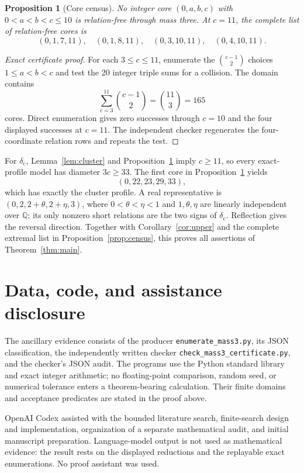 \documentclass[11pt]{article}
\newtheorem{proposition}[theorem]{Proposition}
\theoremstyle{definition}
\newcommand{\Q}{\mathbb Q}
\begin{document}
\begin{proposition}[Core census]\label{prop:core}
No integer core $(0,a,b,c)$ with $0<a<b<c\leq10$ is relation-free through
mass three.  At $c=11$, the complete list of relation-free cores is
\[
 (0,1,7,11),\quad(0,1,8,11),\quad
 (0,3,10,11),\quad(0,4,10,11).
\]
\end{proposition}

\begin{proof}[Exact certificate proof]
For each $3\leq c\leq11$, enumerate the $\binom{c-1}{2}$ choices
$1\leq a<b<c$ and test the 20 integer triple sums for a collision.  The
domain contains
\[
                    \sum_{c=3}^{11}\binom{c-1}{2}
                    =\binom{11}{3}=165
\]
cores.  Direct enumeration gives zero successes through $c=10$ and the four
displayed successes at $c=11$.  The independent checker regenerates the
four-coordinate relation rows and repeats the test.
\end{proof}

For $\delta_{\mathrm c}$, Lemma~\ref{lem:cluster} and
Proposition~\ref{prop:core} imply $c\geq11$, so every exact-profile model has
diameter $3c\geq33$.  The first core in Proposition~\ref{prop:core} yields
\[
                         (0,22,23,29,33),
\]
which has exactly the cluster profile.  A real representative is
$(0,2,2+\theta,2+\eta,3)$, where $0<\theta<\eta<1$ and
$1,\theta,\eta$ are linearly independent over $\Q$; its only nonzero short
relations are the two signs of $\delta_{\mathrm c}$.  Reflection gives the
reversal direction.  Together with Corollary~\ref{cor:upper} and the complete
extremal list in Proposition~\ref{prop:census}, this proves all assertions of
Theorem~\ref{thm:main}.

\section*{Data, code, and assistance disclosure}

The ancillary evidence consists of the producer
\texttt{enumerate\_mass3.py}, its JSON classification, the independently
written checker \texttt{check\_mass3\_certificate.py}, and the checker's JSON
audit.  The programs use the Python standard library and exact integer
arithmetic; no floating-point comparison, random seed, or numerical tolerance
enters a theorem-bearing calculation.  Their finite domains and acceptance
predicates are stated in the proof above.

OpenAI Codex assisted with the bounded literature search, finite-search
design and implementation, organization of a separate mathematical audit,
and initial manuscript preparation.  Language-model output is not used as
mathematical evidence: the result rests on the displayed reductions and the
replayable exact enumerations.  No proof assistant was used.



\end{document}
